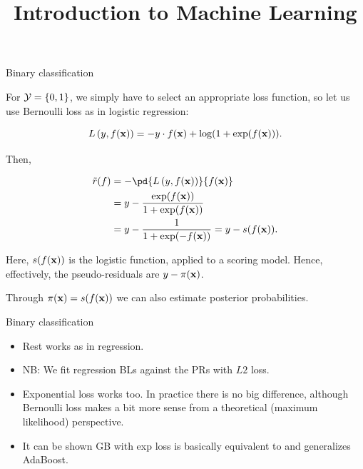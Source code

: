 \documentclass[11pt,compress,t,notes=noshow, xcolor=table]{beamer}
\title{Introduction to Machine Learning}
\begin{document}

\begin{frame2}{Binary classification}


For $\mathcal{Y} = \{0, 1\}$, we simply have to select an appropriate loss function, so let us
use Bernoulli loss as in logistic regression:

$$ L\left(y, f(\mathbf{x})\right) = - y \cdot f(\mathbf{x}) + \log(1 + \exp(f(\mathbf{x}))).$$

Then,

\vspace{-0.5cm}

\begin{align*}
\tilde{r}(f) &=-\pd{\Lxy}{\fx} \\
&= y - \frac{\exp(\fx)}{1 + \exp(\fx)} \\
&= y - \frac{1}{1 + \exp(-\fx)} = y - s(\fx).
\end{align*}

Here, $s(f(\mathbf{x}))$ is the logistic function, applied to a scoring model.
Hence, effectively, the pseudo-residuals are $y - \pi(\mathbf{x})$.

Through $\pi(\mathbf{x}) = s(f(\mathbf{x}))$ we can also estimate posterior probabilities.

\end{frame2}
\begin{frame2}{Binary classification}
%

\begin{itemize}
\item Rest works as in regression.
\item NB: We fit regression BLs against the PRs with $L2$ loss. 
\item  Exponential loss works too. 
    In practice there is no big difference, although Bernoulli loss 
    makes a bit more sense from a theoretical (maximum likelihood) perspective.
\item It can be shown GB with exp loss is basically equivalent to and generalizes AdaBoost. 
\end{itemize}


\end{frame2}
\end{document}
